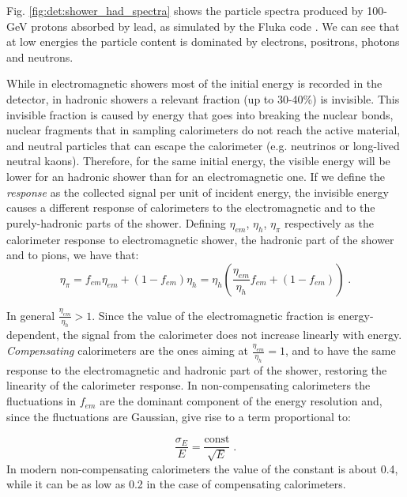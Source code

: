 Fig. \ref{fig:det:shower_had_spectra} shows the particle spectra produced by 100-GeV protons absorbed by lead, as simulated by the Fluka code \cite{Ferrari:898301}. We can see that at low energies the particle content is dominated by electrons, positrons, photons and neutrons.

While in electromagnetic showers most of the initial energy is recorded in the detector, in hadronic showers a relevant fraction (up to 30-40\%) is invisible. This invisible fraction is caused by energy that goes into breaking the nuclear bonds, nuclear fragments that in sampling calorimeters do not reach the active material, and neutral particles that can escape the calorimeter (e.g. neutrinos or long-lived neutral kaons). Therefore, for the same initial energy, the visible energy will be lower for an hadronic shower than for an electromagnetic one. If we define the \textit{response} as the collected signal per unit of incident energy, the invisible energy causes a different response of calorimeters to the electromagnetic and to the purely-hadronic parts of the shower. Defining $\eta_{em}$, $\eta_{h}$, $\eta_{\pi}$ respectively as the calorimeter response to electromagnetic shower, the hadronic part of the shower and to pions, we have that:
\begin{equation}
\eta_{\pi} = f_{em}\eta_{em} + (1-f_{em}) \eta_h = \eta_h \left( \frac{\eta_{em}}{\eta_{h}}f_{em} + (1-f_{em})  \right) \; .
\end{equation}

In general $\frac{\eta_{em}}{\eta_{h}}>1$. Since the value of the electromagnetic fraction is energy-dependent, the signal from the calorimeter does not increase linearly with energy. \textit{Compensating} calorimeters are the ones aiming at $\frac{\eta_{em}}{\eta_{h}}=1$, and to have the same response to the electromagnetic and hadronic part of the shower, restoring the linearity of the calorimeter response. In non-compensating calorimeters the fluctuations in $f_{em}$ are the dominant component of the energy resolution and, since the fluctuations are Gaussian, give rise to a term proportional to:

\begin{equation}
\frac{\sigma_E}{E} = \frac{\mathrm{const}}{\sqrt{E}}  \; .
\end{equation}
In modern non-compensating calorimeters the value of the constant is about 0.4, while it can be as low as 0.2 in the case of compensating calorimeters.




